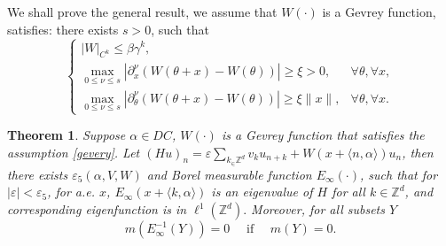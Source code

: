 \documentclass[11pt]{amsart}
\newtheorem{theorem}{Theorem}[section]
\theoremstyle{remark}
\theoremstyle{definition}
\newcommand{\Z}{{\mathbf Z}}
\def \Z{\mathcal{Z}}
\def\Z{{\mathbb Z}}
\begin{document}
We shall prove the general result, we assume that  $W(\cdot)$ is a Gevrey function, satisfies: there exists $s>0$, such that
	\begin{equation}\label{gevery}
	\begin{cases}
   |W|_{C^k}\leq \beta \gamma^k,
   \\\max _{0 \leqslant \nu \leqslant s}\left|\partial_x^\nu(W(\theta+x)-W(\theta))\right| \geqslant \xi>0, & \forall \theta,  \forall x, \\ \max _{0 \leqslant \nu \leqslant s}\left|\partial_\theta^\nu(W(\theta+x)-W(\theta))\right| \geqslant \xi\|x\|, & \forall \theta, \forall x .\end{cases}	\end{equation}

	\begin{theorem}\label{point}
	Suppose $\alpha\in DC$, $W(\cdot)$ is a Gevrey function that satisfies the assumption \eqref{gevery}. Let $(Hu)_n=\varepsilon\sum_{k_\in\Z^d}v_ku_{n+k}+W(x+\langle n,\alpha\rangle)u_n$, then there exists $\varepsilon_5(\alpha,V,W)$ and Borel measurable function $E_{\infty}(\cdot)$, such that for  $|\varepsilon|<\varepsilon_5$,  for a.e. $x$, $E_{\infty}(x+\langle k,\alpha\rangle)$ is an eigenvalue of $H$ for all $k\in\Z^d$, and corresponding eigenfunction is in $\ell^1(\Z^d).$ Moreover, for all subsets $Y$
$$
m(E_{\infty}^{-1}(Y))=0 \quad \text { if } \quad m(Y)=0.
$$
	\end{theorem}
\end{document}
